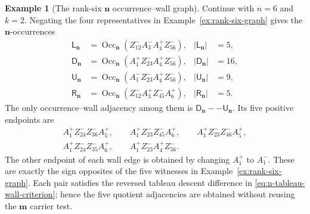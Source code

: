 \documentclass[11pt]{article}
\theoremstyle{definition}
\newtheorem{example}[theorem]{Example}
\theoremstyle{remark}
\newcommand{\Occ}{\operatorname{Occ}}
\newcommand{\mgraph}{\mathbf m}
\newcommand{\ngraph}{\mathbf n}
\begin{document}
\begin{example}[The rank-six $\ngraph$ occurrence--wall graph]
\label{ex:rank-six-n-graph}
Continue with $n=6$ and $k=2$.  Negating the four representatives in
Example~\ref{ex:rank-six-graph} gives the $\ngraph$-occurrences
\begin{align*}
 \mathsf L_{\ngraph}
   &=\Occ_{\ngraph}(Z_{12}^-A_3^-A_4^+Z_{56}^-),
 &|\mathsf L_{\ngraph}|&=5,\\
 \mathsf D_{\ngraph}
   &=\Occ_{\ngraph}(A_1^+Z_{23}^-A_4^+Z_{56}^-),
 &|\mathsf D_{\ngraph}|&=16,\\
 \mathsf U_{\ngraph}
   &=\Occ_{\ngraph}(A_1^-Z_{23}^-A_4^+Z_{56}^-),
 &|\mathsf U_{\ngraph}|&=9,\\
 \mathsf R_{\ngraph}
   &=\Occ_{\ngraph}(Z_{12}^-A_3^+Z_{45}^-A_6^+),
 &|\mathsf R_{\ngraph}|&=5.
\end{align*}
The only occurrence--wall adjacency among them is
$\mathsf D_{\ngraph}--\mathsf U_{\ngraph}$.  Its five positive endpoints
are
\begin{gather*}
 A_1^+Z_{24}^-Z_{36}^-A_5^+,
 \qquad A_1^+Z_{23}^-Z_{45}^-A_6^+,
 \qquad A_1^+Z_{23}^-Z_{46}^-A_5^+,\\
 A_1^+Z_{24}^-Z_{35}^-A_6^+,
 \qquad A_1^+Z_{23}^-A_4^+Z_{56}^-.
\end{gather*}
The other endpoint of each wall edge is obtained by changing $A_1^+$ to
$A_1^-$.  These are exactly the sign opposites of the five witnesses in
Example~\ref{ex:rank-six-graph}.  Each pair satisfies the reversed
tableau descent difference in \eqref{eq:n-tableau-wall-criterion}; hence
the five quotient adjacencies are obtained without reusing the
$\mgraph$ carrier test.

\begin{center}


\end{center}
\end{example}
\end{document}
